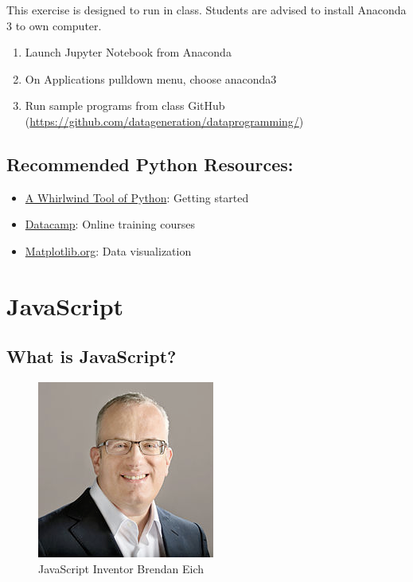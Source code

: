 \documentclass[]{book}
\providecommand{\tightlist}{%
  \setlength{\itemsep}{0pt}\setlength{\parskip}{0pt}}
\begin{document}
This exercise is designed to run in class. Students are advised to install Anaconda 3 to own computer.

\begin{enumerate}
\def\labelenumi{\arabic{enumi}.}
\tightlist
\item
  Launch Jupyter Notebook from Anaconda
\item
  On Applications pulldown menu, choose anaconda3
\item
  Run sample programs from class GitHub (\url{https://github.com/datageneration/dataprogramming/})
\end{enumerate}

\hypertarget{recommended-python-resources}{%
\section{Recommended Python Resources:}\label{recommended-python-resources}}

\begin{itemize}
\tightlist
\item
  \href{https://jakevdp.github.io/WhirlwindTourOfPython/00-introduction.html}{A Whirlwind Tool of Python}: Getting started
\item
  \href{https://datacamp.com}{Datacamp}: Online training courses
\item
  \href{http://matplotlib.org}{Matplotlib.org}: Data visualization
\end{itemize}

\hypertarget{javascript}{%
\chapter{JavaScript}\label{javascript}}

\hypertarget{what-is-javascript}{%
\section{What is JavaScript?}\label{what-is-javascript}}

\begin{figure}

\hfill{}\includegraphics[width=0.25\linewidth]{JavaScriptinventor} 

\caption{JavaScript Inventor Brendan Eich}\label{fig:JavaScriptinventor}
\end{figure}
\end{document}
